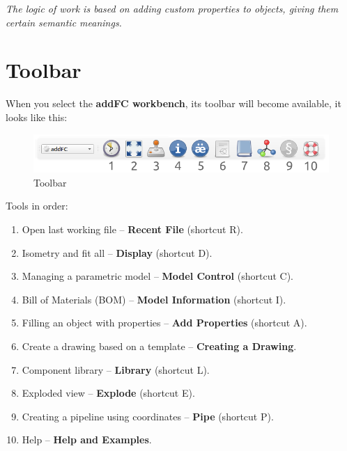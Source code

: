 \documentclass[a4paper,12pt]{article}
\begin{document}
\begin{center}\emph{The logic of work is based on adding custom properties to objects, giving them certain semantic meanings.}\end{center}




\section{Toolbar}

When you select the \textbf{addFC workbench}, its toolbar will become available, it looks like this:

\begin{figure}[htp]
	\centering
	\includegraphics[scale=0.8]{img/toolbar.png}
	\caption{Toolbar}
	\label{sec:toolbar}
\end{figure}

\begin{flushleft}Tools in order:\end{flushleft}
\begin{enumerate}
	\item Open last working file -- \textbf{Recent File} (shortcut R).\label{sec:1}
	\item Isometry and fit all -- \textbf{Display} (shortcut D).\label{sec:2}
	\item Managing a parametric model -- \textbf{Model Control} (shortcut C).\label{sec:3}
	\item Bill of Materials (BOM) -- \textbf{Model Information} (shortcut I).\label{sec:4}
	\item Filling an object with properties -- \textbf{Add Properties} (shortcut A).\label{sec:5}
	\item Create a drawing based on a template -- \textbf{Creating a Drawing}.\label{sec:6}
	\item Component library -- \textbf{Library} (shortcut L).\label{sec:7}
	\item Exploded view -- \textbf{Explode} (shortcut E).\label{sec:8}
    \item Creating a pipeline using coordinates -- \textbf{Pipe} (shortcut P).\label{sec:9}
    \item Help -- \textbf{Help and Examples}.\label{sec:10}
\end{enumerate}
\end{document}
